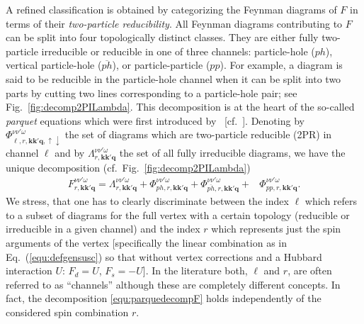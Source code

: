 \documentclass[rmp,aps,reprint,amsmath,amssymb,superscriptaddress,showpacs,nofootinbib]{revtex4-1}
\begin{document}
A refined classification is obtained by categorizing the Feynman diagrams of $F$ in terms of their {\sl two-particle reducibility}. All Feynman diagrams contributing to $F$ can be split into four topologically distinct classes. They are either fully two-particle irreducible or reducible in one of three channels: particle-hole ($ph$), vertical particle-hole ($\overline{ph}$), or particle-particle ($pp$). For example, a diagram is said to be reducible in the particle-hole channel when it can be split into two parts by cutting two lines corresponding to a particle-hole pair; see Fig.~\ref{fig:decomp2PILambda}. This decomposition is at the heart of the so-called {\sl parquet} equations which were first introduced by~ [cf.\ ]. Denoting by $\Phi_{\ell,r,\mathbf{k}\mathbf{k}'\mathbf{q},\uparrow\downarrow}^{\nu\nu'\omega}$ the set of diagrams which are two-particle reducible (2PR) in channel $\ell$ and by $\Lambda_{r,\mathbf{k}\mathbf{k}'\mathbf{q}}^{\nu\nu'\omega}$ the set of all fully irreducible diagrams, we have the unique decomposition (cf.\ Fig.~\ref{fig:decomp2PILambda})
\begin{align}
 \label{equ:parquedecompF}
 F_{r,\mathbf{k}\mathbf{k}'\mathbf{q}}^{\nu\nu'\omega}=\Lambda_{r,\mathbf{k}\mathbf{k}'\mathbf{q}}^{\nu\nu'\omega}+\Phi_{ph,r,\mathbf{k}\mathbf{k}'\mathbf{q}}^{\nu\nu'\omega}+\Phi_{\overline{ph},r,\mathbf{k}\mathbf{k}'\mathbf{q}}^{\nu\nu'\omega}+&\Phi_{pp,r,\mathbf{k}\mathbf{k}'\mathbf{q}}^{\nu\nu'\omega}.
\end{align}
We stress, that one has to clearly discriminate between the index $\ell$ which refers to a subset of diagrams for the full vertex with a certain topology (reducible or irreducible in a given channel) and the index $r$ which represents just the spin arguments of the vertex [specifically the linear combination as in  Eq.~(\ref{equ:defgensusc}) so that without vertex corrections and a Hubbard interaction $U$: $F_d=U$, $F_s=-U$]. In the literature both,  $\ell$ and $r$, are often referred to as ``channels'' although these are completely different concepts. In fact, the decomposition \eqref{equ:parquedecompF} holds independently of the considered spin combination $r$.
\end{document}
